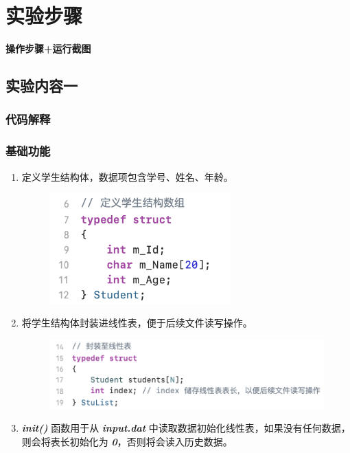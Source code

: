 \section{实验步骤}
    \textbf{操作步骤+运行截图}
    \subsection{实验内容一}
        \subsubsection{代码解释}
            \subsubsection*{基础功能}
                \begin{enumerate}
                    \item 定义学生结构体，数据项包含学号、姓名、年龄。
                        \begin{figure}[htbp]
                            \includegraphics[width = 7cm]{work1_s1.png}
                        \end{figure}
                    \item 将学生结构体封装进线性表，便于后续文件读写操作。
                        \begin{figure}[htbp]
                            \includegraphics*[width = 15cm]{work1_s2.png}
                        \end{figure}
                    \newpage
                    \item \textbf{\textit{init()}} 函数用于从 \textbf{\textit{input.dat}} 中读取数据初始化线性表，如果没有任何数据，则会将表长初始化为 \textbf{\textit{0}}，否则将会读入历史数据。

\end{enumerate}
